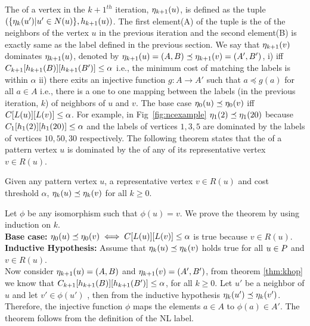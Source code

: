 The \ncl of a vertex in the ${k+1}^{th}$ iteration, $\eta_{k+1}(u)$, is defined
as the tuple $(\{\eta_{k}(u') | u' \in N(u)\}, h_{k+1}(u))$.  The
first element(A) of the tuple is the \ncl of the neighbors of the vertex $u$ in
the previous iteration and the second element(B) is exactly same as the \khop
label defined in the previous section. We say that $\eta_{k+1}(v)$ dominates
$\eta_{k+1}(u)$, denoted by $\eta_{k+1}(u) = (A, B) \preceq \eta_{k+1}(v) =
(A', B') $, i) iff $C_{k+1}[h_{k+1}(B)][h_{k+1}(B')] \leq \alpha$ i.e., the minimum cost of
matching the \khop labels is within $\alpha$ ii) there exits an injective
function $g\!\!:A\rightarrow A'$ such that $a \preceq g(a)$ for all $a \in A$
i.e., there is a one to one mapping between the \ncl labels (in the previous
iteration, $k$) of neighbors of $u$ and $v$.  The base case $\eta_{0}(u)
\preceq \eta_{0}(v)$ iff ${C}[L(u)][L(v)] \leq \alpha$. For example, in
Fig~\ref{fig:ncexample} $\eta_{1}(2) \preceq \eta_{1}(20)$ because
$C_{1}[h_{1}(2)][h_{1}(20)] \leq \alpha$ and the \ncl labels of vertices $1, 3, 5$ are
dominated by the \ncl labels of vertices $10, 50, 30$ respectively.  The
following theorem states that the \ncl of a pattern vertex $u$ is dominated by
the \ncl of any of its representative vertex $v \in  R(u)$.

\begin{thm} Given any pattern vertex $u$, a representative vertex $v \in R(u)$
    and cost threshold $\alpha$, $\eta_{k}(u) \preceq \eta_{k}(v)$ for all $k
    \geq 0$.  \begin{myproof} Let $\phi$ be any isomorphism such that $\phi(u) =
        v$.  We prove the theorem by using induction on $k$.\\ \textbf{Base
        case:} $\eta_{0}(u) \preceq \eta_{0}(v) \iff {C}[L(u)][L(v)]
        \leq \alpha$ is true because $v \in R(u)$. \\ \textbf{Inductive
        Hypothesis:} Assume that $\eta_{k}(u) \preceq \eta_{k}(v)$ holds true
        for all $u \in P$ and $v \in R(u)$. \\ Now consider $\eta_{k+1}(u) =
        (A, B)$  and $ \eta_{k+1}(v) = (A', B') $, from theorem \ref{thm:khop}
        we know that $C_{k+1}[h_{k+1}(B)][h_{k+1}(B')] \leq \alpha$, for all $k \geq 0$.
        Let $u'$ be a neighbor of $u$ and let $v' \in \phi(u')$ , then from the
        inductive hypothesis $\eta_{k}(u') \preceq \eta_{k}(v')$.  Therefore,
        the injective function $\phi$ maps the elements $a \in A$ to $\phi(a)
        \in A'$.  The theorem follows from the definition of the NL label.
    \end{myproof} \label{thm:ncl} \end{thm}

